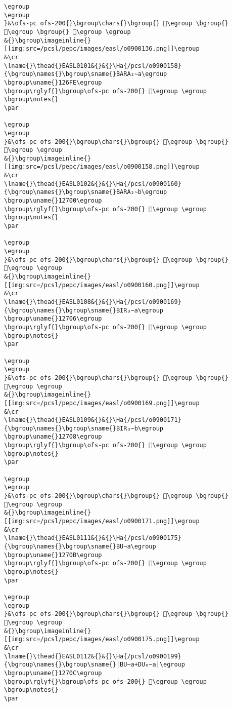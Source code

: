 \begin{verbatim}
\egroup
\egroup
}&\ofs-pc ofs-200{}\bgroup\chars{}\bgroup{} 𒛮\egroup \bgroup{} 𒛯\egroup \bgroup{} 𒛰\egroup \egroup
&{}\bgroup\imageinline{}[[img:src=/pcsl/pepc/images/easl/o0900136.png]]\egroup
&\cr
\lname{}\thead{}EASL0101&{}&{}\Ha{/pcsl/o0900158}{\bgroup\names{}\bgroup\sname{}BARA₂∼a\egroup
\bgroup\uname{}126FE\egroup
\bgroup\rglyf{}\bgroup\ofs-pc ofs-200{} 𒛾\egroup \egroup
\bgroup\notes{}
\par 

\egroup
\egroup
}&\ofs-pc ofs-200{}\bgroup\chars{}\bgroup{} 𒛾\egroup \bgroup{} 𒛿\egroup \egroup
&{}\bgroup\imageinline{}[[img:src=/pcsl/pepc/images/easl/o0900158.png]]\egroup
&\cr
\lname{}\thead{}EASL0102&{}&{}\Ha{/pcsl/o0900160}{\bgroup\names{}\bgroup\sname{}BARA₂∼b\egroup
\bgroup\uname{}12700\egroup
\bgroup\rglyf{}\bgroup\ofs-pc ofs-200{} 𒜀\egroup \egroup
\bgroup\notes{}
\par 

\egroup
\egroup
}&\ofs-pc ofs-200{}\bgroup\chars{}\bgroup{} 𒜀\egroup \bgroup{} 𒜁\egroup \egroup
&{}\bgroup\imageinline{}[[img:src=/pcsl/pepc/images/easl/o0900160.png]]\egroup
&\cr
\lname{}\thead{}EASL0108&{}&{}\Ha{/pcsl/o0900169}{\bgroup\names{}\bgroup\sname{}BIR₃∼a\egroup
\bgroup\uname{}12706\egroup
\bgroup\rglyf{}\bgroup\ofs-pc ofs-200{} 𒜆\egroup \egroup
\bgroup\notes{}
\par 

\egroup
\egroup
}&\ofs-pc ofs-200{}\bgroup\chars{}\bgroup{} 𒜇\egroup \bgroup{} 𒜆\egroup \egroup
&{}\bgroup\imageinline{}[[img:src=/pcsl/pepc/images/easl/o0900169.png]]\egroup
&\cr
\lname{}\thead{}EASL0109&{}&{}\Ha{/pcsl/o0900171}{\bgroup\names{}\bgroup\sname{}BIR₃∼b\egroup
\bgroup\uname{}12708\egroup
\bgroup\rglyf{}\bgroup\ofs-pc ofs-200{} 𒜈\egroup \egroup
\bgroup\notes{}
\par 

\egroup
\egroup
}&\ofs-pc ofs-200{}\bgroup\chars{}\bgroup{} 𒜉\egroup \bgroup{} 𒜈\egroup \egroup
&{}\bgroup\imageinline{}[[img:src=/pcsl/pepc/images/easl/o0900171.png]]\egroup
&\cr
\lname{}\thead{}EASL0111&{}&{}\Ha{/pcsl/o0900175}{\bgroup\names{}\bgroup\sname{}BU∼a\egroup
\bgroup\uname{}1270B\egroup
\bgroup\rglyf{}\bgroup\ofs-pc ofs-200{} 𒜋\egroup \egroup
\bgroup\notes{}
\par 

\egroup
\egroup
}&\ofs-pc ofs-200{}\bgroup\chars{}\bgroup{} 𒜓\egroup \bgroup{} 𒜋\egroup \egroup
&{}\bgroup\imageinline{}[[img:src=/pcsl/pepc/images/easl/o0900175.png]]\egroup
&\cr
\lname{}\thead{}EASL0112&{}&{}\Ha{/pcsl/o0900199}{\bgroup\names{}\bgroup\sname{}|BU∼a+DU₆∼a|\egroup
\bgroup\uname{}1270C\egroup
\bgroup\rglyf{}\bgroup\ofs-pc ofs-200{} 𒜌\egroup \egroup
\bgroup\notes{}
\par 


\end{verbatim}
